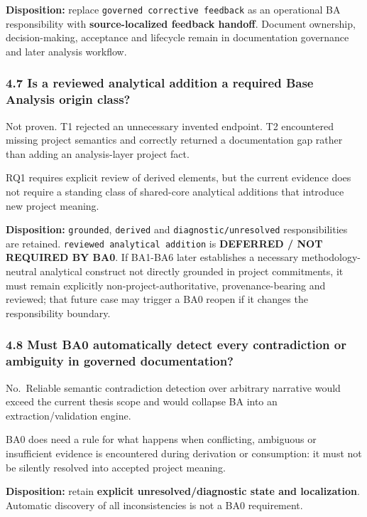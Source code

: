 \documentclass[
  10pt,
]{article}
\begin{document}
\textbf{Disposition:} replace \texttt{governed\ corrective\ feedback} as
an operational BA responsibility with \textbf{source-localized feedback
handoff}. Document ownership, decision-making, acceptance and lifecycle
remain in documentation governance and later analysis workflow.

\subsubsection{4.7 Is a reviewed analytical addition a required Base
Analysis origin
class?}\label{is-a-reviewed-analytical-addition-a-required-base-analysis-origin-class}

Not proven. T1 rejected an unnecessary invented endpoint. T2 encountered
missing project semantics and correctly returned a documentation gap
rather than adding an analysis-layer project fact.

RQ1 requires explicit review of derived elements, but the current
evidence does not require a standing class of shared-core analytical
additions that introduce new project meaning.

\textbf{Disposition:} \texttt{grounded}, \texttt{derived} and
\texttt{diagnostic/unresolved} responsibilities are retained.
\texttt{reviewed\ analytical\ addition} is \textbf{DEFERRED / NOT
REQUIRED BY BA0}. If BA1-BA6 later establishes a necessary
methodology-neutral analytical construct not directly grounded in
project commitments, it must remain explicitly
non-project-authoritative, provenance-bearing and reviewed; that future
case may trigger a BA0 reopen if it changes the responsibility boundary.

\subsubsection{4.8 Must BA0 automatically detect every contradiction or
ambiguity in governed
documentation?}\label{must-ba0-automatically-detect-every-contradiction-or-ambiguity-in-governed-documentation}

No.~Reliable semantic contradiction detection over arbitrary narrative
would exceed the current thesis scope and would collapse BA into an
extraction/validation engine.

BA0 does need a rule for what happens when conflicting, ambiguous or
insufficient evidence is encountered during derivation or consumption:
it must not be silently resolved into accepted project meaning.

\textbf{Disposition:} retain \textbf{explicit unresolved/diagnostic
state and localization}. Automatic discovery of all inconsistencies is
not a BA0 requirement.
\end{document}
